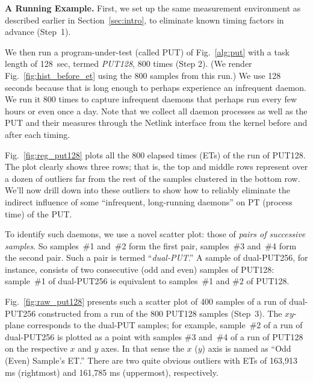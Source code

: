 \documentclass[letter]{ieice}
\begin{document}
{\bf A Running Example.} 
{\color{blue}
First, we set up the same measurement environment as described earlier in Section~\ref{sec:intro}, 
to eliminate known timing factors in advance (Step~1).}

We then run a program-under-test (called PUT) of 
Fig.~\ref{alg:put} with a task length of 128~sec, 
termed {\em PUT128}, 800 times (Step 2). 
(We render Fig.~\ref{fig:hist_before_et} using the 800 samples from this run.)
We use 128 seconds because that is long enough to perhaps experience an infrequent daemon. 
We run it 800 times to capture infrequent daemons that perhaps run every few hours or even 
once a day. 
Note that we collect all daemon processes as well as the PUT and their measures 
through the Netlink interface from the kernel before and after each 
timing.

Fig.~\ref{fig:reg_put128} plots all the 800 elapsed times (ETs) of the run of PUT128.
The plot clearly shows three rows; that is, 
the top and middle rows represent over a dozen of outliers far from 
the rest of the samples clustered in the bottom row. 
We'll now drill down into these outliers to 
show how to reliably eliminate the indirect influence of 
some ``infrequent, long-running daemons'' on PT (\hbox{process} time) of the PUT.

To identify such daemons, we use a novel \hbox{scatter} plot: 
those of {\em pairs of successive samples}{\color{red}. 
So \hbox{samples}~\#{1} and~\#{2} form the first pair, 
samples~\#{3} and~\#{4} form the second pair.
Such a pair is termed ``\hbox{{\it dual-PUT}}.'' 
A sample of \hbox{dual-PUT256}, for instance, 
consists of two consecutive (odd and even) 
samples of PUT128: 
sample~\#{1} of dual-PUT256 is equivalent 
to samples~\#{1} and \#{2} of PUT128.}

Fig.~\ref{fig:raw_put128} presents such a scatter plot 
of 400 samples of a run of \hbox{dual-PUT256} constructed 
from a run of the 800 PUT128 samples (Step~3). 
{\color{red} The $xy$-plane corresponds to the dual-PUT samples; 
for example, \hbox{sample}~\#{2} of a run of dual-PUT256 
is plotted as a point with samples \#{3} and~\#{4} of a run of PUT128 
on the respective $x$ and $y$ axes. In that sense 
the $x$ ($y$) axis is named as ``Odd (Even) Sample's ET.''}
There are two quite obvious outliers with ETs 
of 163,913 ms (rightmost) and 161,785 ms (uppermost), respectively.
\end{document}
